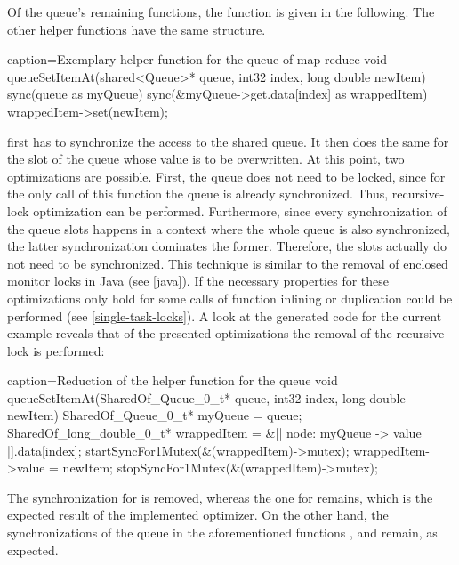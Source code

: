 Of the queue's remaining functions, the function  is given in the following. The other helper functions have the same structure.
\begin{ccode}{caption=Exemplary helper function for the queue of map-reduce}
void queueSetItemAt(shared<Queue>* queue, int32 index, long double newItem) { 
  sync(queue as myQueue) { 
    sync(&myQueue->get.data[index] as wrappedItem) { wrappedItem->set(newItem); } 
  } 
}
\end{ccode}
 first has to synchronize the access to the shared queue. It then does the same for the slot of the queue whose value is to be overwritten. At this point, two optimizations are possible. First, the queue does not need to be locked, since for the only call of this function the queue is already synchronized. Thus, recursive-lock optimization can be performed. Furthermore, since every synchronization of the queue slots happens in a context where the whole queue is also synchronized, the latter synchronization dominates the former. Therefore, the slots actually do not need to be synchronized. This technique is similar to the removal of enclosed monitor locks in Java (see \ref{java}). If the necessary properties for these optimizations only hold for some calls of  function inlining or duplication could be performed (see \ref{single-task-locks}). A look at the generated code for the current example reveals that of the presented optimizations the removal of the recursive lock is performed:
\begin{ccode}{caption=Reduction of the helper function for the queue}
void queueSetItemAt(SharedOf_Queue_0_t* queue, int32 index, long double newItem) { 
  { 
    SharedOf_Queue_0_t* myQueue = queue; 
    { 
      { 
        SharedOf_long_double_0_t* wrappedItem = &[| node: myQueue -> value |].data[index]; 
        startSyncFor1Mutex(&(wrappedItem)->mutex); 
        { wrappedItem->value = newItem; } 
        stopSyncFor1Mutex(&(wrappedItem)->mutex); 
      } 
    } 
  } 
}
\end{ccode}
The synchronization for  is removed, whereas the one for  remains, which is the expected result of the implemented optimizer. On the other hand, the synchronizations of the queue in the aforementioned functions ,  and  remain, as expected.


